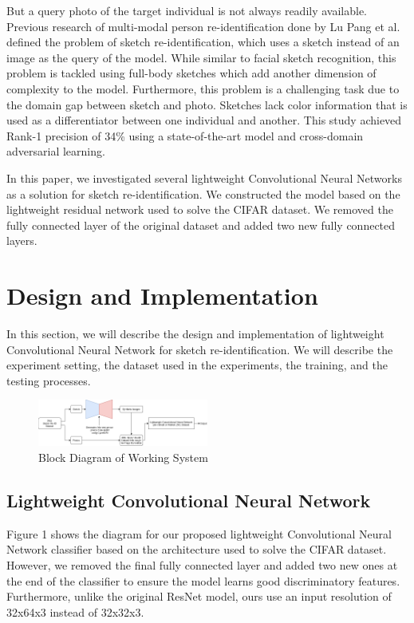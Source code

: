 \documentclass[conference]{IEEEtran}
\begin{document}
	\vspace{1ex} 
	
	But a query photo of the target individual is not always readily available. Previous research of multi-modal person re-identification done by Lu Pang et al.\cite{cit:5} defined the problem of sketch re-identification, which uses a sketch instead of an image as the query of the model. While similar to facial sketch recognition, this problem is tackled using full-body sketches which add another dimension of complexity to the model. Furthermore, this problem is a challenging task due to the domain gap between sketch and photo. Sketches lack color information that is used as a differentiator between one individual and another. This study achieved Rank-1 precision of 34\% using a state-of-the-art model and cross-domain adversarial learning.
	
	\vspace{1ex} 
	
	In this paper, we investigated several lightweight Convolutional Neural Networks as a solution for sketch re-identification. We constructed the model based on the lightweight residual network used to solve the CIFAR dataset. We removed the fully connected layer of the original dataset and added two new fully connected layers.
	
	\section{Design and Implementation}
	\vspace{1ex}
	In this section, we will describe the design and implementation of lightweight Convolutional Neural Network for sketch re-identification. We will describe the experiment setting, the dataset used in the experiments, the training, and the testing processes.
	\vspace{1ex}
	\begin{figure}[!ht] \centering
		\includegraphics[width=0.5\textwidth]{img/desain_sistem.png}
		\caption{Block Diagram of Working System}
		\label{fig:1}
	\end{figure}
	
	\vspace{1ex}
	
	\subsection{Lightweight Convolutional Neural Network}
	\vspace{1ex}
	Figure 1 shows the diagram for our proposed lightweight Convolutional Neural Network classifier based on the architecture used to solve the CIFAR dataset. However, we removed the final fully connected layer and added two new ones at the end of the classifier to ensure the model learns good discriminatory features. Furthermore, unlike the original ResNet model, ours use an input resolution of 32x64x3 instead of 32x32x3. 
	
\end{document}
